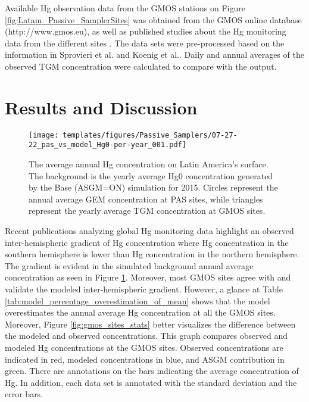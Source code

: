 \begin{flushleft}
  Available Hg observation data from the GMOS stations on Figure  \ref{fig:Latam_Passive_SamplerSites} was obtained from the GMOS online database (http://www.gmos.eu), as well as published studies about the Hg monitoring data from the different sites  \cite{koenig_seasonal_2021,sprovieri_atmospheric_2016}. The data sets were pre-processed based on the information in Sprovieri et al.\cite{sprovieri_atmospheric_2016} and Koenig et al.\cite{koenig_seasonal_2021}. Daily and annual averages of the observed TGM concentration were calculated to compare with the \gc output. 
\end{flushleft}





\section{Results and Discussion}\label{c2_results}
\begin{figure}[H]
\centering
  \texttt{[image: templates/figures/Passive\_Samplers/07-27-22\_pas\_vs\_model\_Hg0-per-year\_001.pdf]}
  \caption[The average annual Hg concentration on Latin America's surface. ]{The average annual Hg concentration on Latin America's surface. The background is the yearly average Hg0 concentration generated by the Base (ASGM=ON) simulation for 2015. Circles represent the annual average GEM concentration at PAS sites, while triangles represent the yearly average TGM concentration at GMOS sites\cite{quant_measuring_2021,sprovieri_atmospheric_2016,koenig_seasonal_2021}.}
  \label{fig:06-12-22_pas_vs_model_Hg0-per-year_001}
  
  
\end{figure}
\FloatBarrier
\begin{flushleft}
 Recent publications analyzing global Hg monitoring data highlight an observed inter-hemispheric gradient of Hg concentration where Hg concentration in the southern hemisphere is lower than Hg concentration in the northern hemisphere\cite{united_nations_environment_programme_technical_2019,sprovieri_atmospheric_2016}. The gradient is evident in the simulated background annual average \hg concentration as seen in Figure \ref{fig:06-12-22_pas_vs_model_Hg0-per-year_001}. Moreover, most GMOS sites agree with and validate the modeled inter-hemispheric gradient. However, a glance at Table \ref{tab:model_percentage_overestimation_of_mean} shows that the model overestimates the annual average Hg concentration at all the GMOS sites. Moreover, Figure \ref{fig:gmos_sites_stats} better visualizes the difference between the modeled and observed concentrations. This graph compares observed and modeled Hg concentrations at the GMOS sites. Observed concentrations are indicated in red, modeled concentrations in blue, and ASGM contribution in green. There are annotations on the bars indicating the average concentration of Hg. In addition, each data set is annotated with the standard deviation and the error bars.
\end{flushleft}



